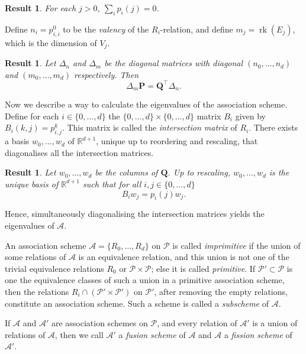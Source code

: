 \documentclass[a4paper]{article}
\newtheorem{res}[thm]{Result}
\theoremstyle{definition}
\newcommand{\RR}{\mathbb R}
\newcommand{\pp}{\mathcal P}
\newcommand{\ma}{\mathcal A}
\DeclareMathOperator{\rk}{rk}
\begin{document}
\begin{res}
 \label{Res:SumEigenvalues}
 For each $j > 0$, $\sum_i p_i(j) = 0$.
\end{res}

Define $n_i = p^0_{i,i}$ to be the \emph{valency} of the $R_i$-relation, and define $m_j = \rk(E_j)$, which is the dimension of $V_j$.

\begin{res}
 \label{ResIdentityEigenvalueMatrices}
 Let $\Delta_n$ and $\Delta_m$ be the diagonal matrices with diagonal $(n_0, \dots, n_d)$ and $(m_0, \dots, m_d)$ respectively.
 Then
 \[
  \Delta_m \mathbf P = \mathbf Q^\top \Delta_n.
 \]
\end{res}

Now we describe a way to calculate the eigenvalues of the association scheme.
Define for each $i \in \{0,\dots,d\}$ the $\{0,\dots,d\} \times \{0,\dots,d\}$ matrix $B_i$ given by $B_i(k,j) = p^k_{i,j}$.
This matrix is called the \emph{intersection matrix} of $R_i$.
There exists a basis $w_0, \dots, w_d$ of $\RR^{d+1}$, unique up to reordering and rescaling, that diagonalises all the intersection matrices.

\begin{res}\label{ResComputationEigenvaluesScheme}
 Let $w_0, \dots, w_d$ be the columns of $\mathbf Q$.
 Up to rescaling, $w_0, \dots, w_d$ is the unique basis of $\RR^{d+1}$ such that for all $i,j \in \{0,\dots,d\}$
 \[
  B_i w_j = p_i(j) w_j.
 \]
\end{res}

Hence, simultaneously diagonalising the intersection matrices yields the eigenvalues of $\ma$.

\bigskip

An association scheme $\ma = \{R_0, \dots, R_d\}$ on $\pp$ is called \emph{imprimitive} if the union of some relations of $\ma$ is an equivalence relation, and this union is not one of the trivial equivalence relations $R_0$ or $\pp \times \pp$; else it is called \emph{primitive}.
If $\pp' \subset \pp$ is one the equivalence classes of such a union in a primitive association scheme, then the relations $R_i \cap (\pp' \times \pp')$ on $\pp'$, after removing the empty relations, constitute an association scheme.
Such a scheme is called a \emph{subscheme} of $\ma$.

If $\ma$ and $\ma'$ are association schemes on $\pp$, and every relation of $\ma'$ is a union of relations of $\ma$, then we call $\ma'$ a \emph{fusion scheme} of $\ma$ and $\ma$ a \emph{fission scheme} of $\ma'$.
\end{document}
